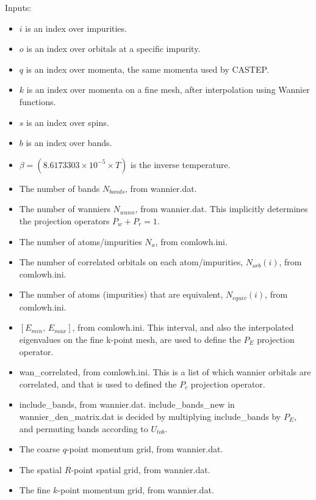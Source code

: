 \documentclass[aps,prb,singlecolumn,preprintnumbers,amsmath,amssymb]{revtex4}
\begin{document}
Inputs:
\begin{itemize}
\item $i$ is an index over impurities.
\item $o$ is an index over orbitals at a specific impurity.
\item $q$ is an index over momenta, the same momenta used by CASTEP.
\item $k$ is an index over  momenta on a fine mesh, after interpolation using Wannier functions.
\item $s$ is an index over spins.  
\item $b$ is an index over bands.
\item $\beta = (8.6173303 \times 10^{-5} \times T) $ is the inverse temperature.  
\item The number of bands $N_{bands}$, from wannier.dat. %
\item The number of wanniers $N_{wann}$, from wannier.dat.  This implicitly determines the projection operators $P_w + P_r = 1$. %
\item The number of atoms/impurities $N_a$, from comlowh.ini.
\item  The number of correlated orbitals on each atom/impurities, $N_{orb}(i)$, from comlowh.ini. %
\item The number of atoms (impurities) that are equivalent, $N_{equiv}(i)$, from comlowh.ini. %
\item $[E_{min}, \, E_{max}]$, from comlowh.ini. This interval, and also the interpolated eigenvalues on the fine k-point mesh,  are used to define  the $ P_E$ projection operator.  
\item wan\_correlated, from comlowh.ini.  This is a list of which wannier orbitals are correlated, and that is used to defined the $P_c$ projection operator.
\item include\_bands, from wannier.dat. include\_bands\_new in wannier\_den\_matrix.dat is decided by multiplying include\_bands by $P_E$, and permuting bands according to $U_{tob}$.  %
\item The coarse $q$-point momentum grid, from wannier.dat. %
\item The spatial $R$-point spatial grid, from wannier.dat. %
\item The fine $k$-point momentum grid, from wannier.dat. %

\end{itemize}
\end{document}
